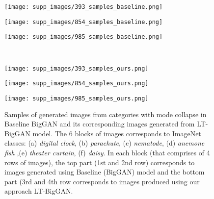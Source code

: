 \documentclass[10pt,twocolumn,letterpaper]{article}
\begin{document}
\begin{figure*}[t]
    
    \begin{minipage}{.32\textwidth}
    \texttt{[image: supp\_images/393\_samples\_baseline.png]}
    \end{minipage}\hspace{0.01cm}
    \begin{minipage}{.32\textwidth}
    \texttt{[image: supp\_images/854\_samples\_baseline.png]}
    \end{minipage}\hspace{0.01cm}
    \begin{minipage}{.32\textwidth}
    \texttt{[image: supp\_images/985\_samples\_baseline.png]}
    \end{minipage} \\
    \vspace{-8pt}
    \begin{minipage}{.32\textwidth}
    \texttt{[image: supp\_images/393\_samples\_ours.png]}
    \subcaption{}
    \end{minipage}\hspace{0.01cm}
    \begin{minipage}{.32\textwidth}
    \texttt{[image: supp\_images/854\_samples\_ours.png]}
    \subcaption{}
    \end{minipage}\hspace{0.01cm}
    \begin{minipage}{.32\textwidth}
    \texttt{[image: supp\_images/985\_samples\_ours.png]}
    \subcaption{}
    \end{minipage} 
    \caption{\footnotesize{Samples of generated images from categories with mode collapse in Baseline BigGAN and its corresponding images generated from LT-BigGAN model. The 6 blocks of images corresponds to ImageNet classes: (a) \textit{digital clock}, (b) \textit{parachute}, (c) \textit{nematode}, (d) \textit{anemone fish} ,(e) \textit{theater curtain}, (f) \textit{daisy}. In each block (that comprises of 4 rows of images), the top part (1st and 2nd row) corresponds to images generated using Baseline (BigGAN) model and the bottom part (3rd and 4th row corresponds to images produced using our approach LT-BigGAN. }}
    \label{fig:lt-biggan_imagenet_mode}
\end{figure*}
\end{document}
